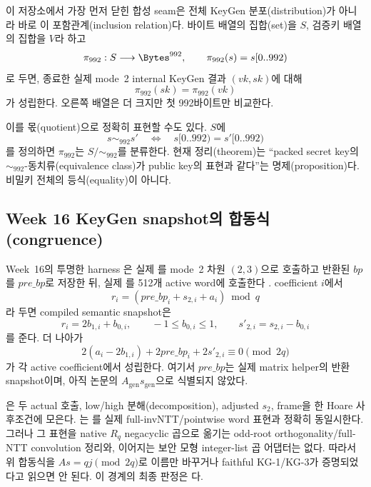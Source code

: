 이 저장소에서 가장 먼저 닫힌 합성 seam은 전체 KeyGen 분포(distribution)가
아니라 바로 이
포함관계(inclusion relation)다. 바이트 배열의 집합(set)을 \(S\), 검증키
배열의 집합을 \(V\)라 하고
\[
  \pi_{992}:S\longrightarrow \Bytes^{992},\qquad
  \pi_{992}(s)=s[0..992)
\]
로 두면, 종료한 실제 mode~2 internal KeyGen 결과 \((vk,sk)\)에 대해
\[
  \pi_{992}(sk)=\pi_{992}(vk)
\]
가 성립한다. 오른쪽 배열은 더 크지만 첫 992바이트만 비교한다.

이를 몫(quotient)으로 정확히 표현할 수도 있다. \(S\)에
\[
  s\sim_{992}s'\quad\Longleftrightarrow\quad
  s[0..992)=s'[0..992)
\]
를 정의하면 \(\pi_{992}\)는 \(S/{\sim_{992}}\)를 분류한다. 현재
정리(theorem)는 ``packed secret key의 \(\sim_{992}\)-동치류(equivalence
class)가 public key의 표현과 같다''는 명제(proposition)다. 비밀키 전체의
등식(equality)이 아니다.

\subsection{Week 16 KeyGen snapshot의 합동식(congruence)}

Week~16의 투명한 harness
은 실제
를 mode~2 차원 \((2,3)\)으로 호출하고 반환된
\(bp\)를 \(\mathit{pre\_bp}\)로 저장한 뒤, 실제
를 512개 active word에 호출한다
\cite{week16-mincore-plan,week16-kg-report,week16-kg-ntt-mul-report}.
coefficient \(i\)에서
\[
  r_i=(\mathit{pre\_bp}_i+s_{2,i}+a_i)\bmod q
\]
라 두면 compiled semantic snapshot은
\[
  r_i=2b_{1,i}+b_{0,i},\qquad -1\le b_{0,i}\le1,
  \qquad s'_{2,i}=s_{2,i}-b_{0,i}
\]
를 준다. 더 나아가
\[
  2(a_i-2b_{1,i})+2\mathit{pre\_bp}_i+2s'_{2,i}
  \equiv0\pmod{2q}
\]
가 각 active coefficient에서 성립한다. 여기서 \(\mathit{pre\_bp}\)는 실제
matrix helper의 반환 snapshot이며, 아직 논문의
\(A_{\mathrm{gen}}s_{\mathrm{gen}}\)으로 식별되지 않았다.

\begin{caution}
은 두 actual 호출,
low/high 분해(decomposition), adjusted \(s_2\), frame을 한 Hoare 사후조건에
모은다. 는
를 실제
full-invNTT/pointwise word 표현과 정확히 동일시한다. 그러나 그 표현을 native
\(R_q\) negacyclic 곱으로 옮기는 odd-root orthogonality/full-NTT convolution
정리와, 이어지는 보안 모형 integer-list 곱 어댑터는 없다. 따라서 위 합동식을
\(A s=qj\pmod{2q}\)로 이름만 바꾸거나 faithful KG-1/KG-3가 증명되었다고 읽으면
안 된다. 이 경계의 최종 판정은 다.
\end{caution}

